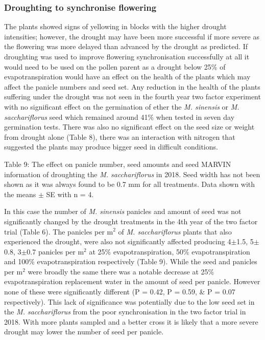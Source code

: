 \documentclass[fleqn, 15pt, lineno]{olplainarticle}
\begin{document}
\FloatBarrier
\subsubsection{Droughting to synchronise flowering}
The plants showed signs of yellowing in blocks with the higher drought intensities; however, the drought may have been more successful if more severe as the flowering was more delayed than advanced by the drought as predicted.
If droughting was used to improve flowering synchronisation successfully at all it would need to be used on the pollen parent as a drought below 25\% of evapotranspiration would have an effect on the health of the plants which may affect the panicle numbers and seed set.
Any reduction in the health of the plants suffering under the drought was not seen in the fourth year two factor experiment with no significant effect on the germination of ether the \textit{M. sinensis} or \textit{M. sacchariflorus} seed which remained around 41\% when tested in seven day germination tests.
There was also no significant effect on the seed size or weight from drought alone (Table 8), there was an interaction with nitrogen that suggested the plants may produce bigger seed in difficult conditions.

Table 9: The effect on panicle number, seed amounts and seed MARVIN information of droughting the \textit{M. sacchariflorus} in 2018.
Seed width has not been shown as it was always found to be 0.7 mm for all treatments.
Data shown with the means $\pm$ SE with n = 4.
 

In this case the number of \textit{M. sinensis} panicles and amount of seed was not significantly changed by the drought treatments in the 4th year of the two factor trial (Table 6).
The panicles per m$^2$ of \textit{M. sacchariflorus} plants that also experienced the drought, were also not significantly affected producing 4$\pm$1.5, 5$\pm$0.8, 3$\pm$0.7 panicles per m$^2$ at 25\% evapotranspiration, 50\% evapotranspiration and 100\% evapotranspiration respectively (Table 9).
While the seed and panicles per m$^2$ were broadly the same there was a notable decrease at 25\% evapotranspiration replacement water in the amount of seed per panicle.
However none of these were significantly different (P = 0.42, P = 0.59, \& P = 0.07 respectively).
This lack of significance was potentially due to the low seed set in the \textit{M. sacchariflorus} from the poor synchronisation in the two factor trial in 2018.
With more plants sampled and a better cross it is likely that a more severe drought may lower the number of seed per panicle.
\end{document}
